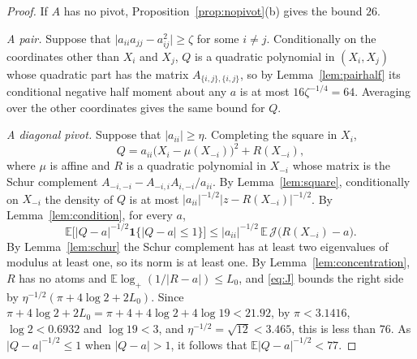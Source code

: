\documentclass[11pt]{amsart}
\numberwithin{equation}{section}
\theoremstyle{definition}
\theoremstyle{remark}
\newcommand{\E}{\mathbb E}
\newcommand{\1}{\mathbf 1}
\newcommand{\logp}{\log_+}
\newcommand{\abs}[1]{\lvert #1\rvert}
\begin{document}
\begin{proof}
If $A$ has no pivot, Proposition~\ref{prop:nopivot}(b) gives the bound $26$.

\emph{A pair.} Suppose that $\abs{a_{ii}a_{jj}-a_{ij}^2}\ge\zeta$ for some $i\ne j$. Conditionally on the coordinates other than $X_i$ and $X_j$, $Q$ is a quadratic polynomial in $(X_i,X_j)$ whose quadratic part has the matrix $A_{\{i,j\},\{i,j\}}$, so by Lemma~\ref{lem:pairhalf} its conditional negative half moment about any $a$ is at most $16\zeta^{-1/4}=64$. Averaging over the other coordinates gives the same bound for $Q$.

\emph{A diagonal pivot.} Suppose that $\abs{a_{ii}}\ge\eta$. Completing the square in $X_i$,
\begin{equation}\label{eq:profile}
Q=a_{ii}\bigl(X_i-\mu(X_{-i})\bigr)^2+R(X_{-i}),
\end{equation}
where $\mu$ is affine and $R$ is a quadratic polynomial in $X_{-i}$ whose matrix is the Schur complement $A_{-i,-i}-A_{-i,i}A_{i,-i}/a_{ii}$. By Lemma~\ref{lem:square}, conditionally on $X_{-i}$ the density of $Q$ is at most $\abs{a_{ii}}^{-1/2}\abs{z-R(X_{-i})}^{-1/2}$. By Lemma~\ref{lem:condition}, for every $a$,
\[
\E\bigl[\abs{Q-a}^{-1/2}\1\{\abs{Q-a}\le1\}\bigr]\le\abs{a_{ii}}^{-1/2}\,\E\,\mathcal J\bigl(R(X_{-i})-a\bigr).
\]
By Lemma~\ref{lem:schur} the Schur complement has at least two eigenvalues of modulus at least one, so its norm is at least one. By Lemma~\ref{lem:concentration}, $R$ has no atoms and $\E\logp(1/\abs{R-a})\le L_0$, and \eqref{eq:J} bounds the right side by $\eta^{-1/2}(\pi+4\log2+2L_0)$. Since $\pi+4\log2+2L_0=\pi+4+4\log2+4\log19<21.92$, by $\pi<3.1416$, $\log2<0.6932$ and $\log19<3$, and $\eta^{-1/2}=\sqrt{12}<3.465$, this is less than $76$. As $\abs{Q-a}^{-1/2}\le1$ when $\abs{Q-a}>1$, it follows that $\E\abs{Q-a}^{-1/2}<77$.
\end{proof}
\end{document}
